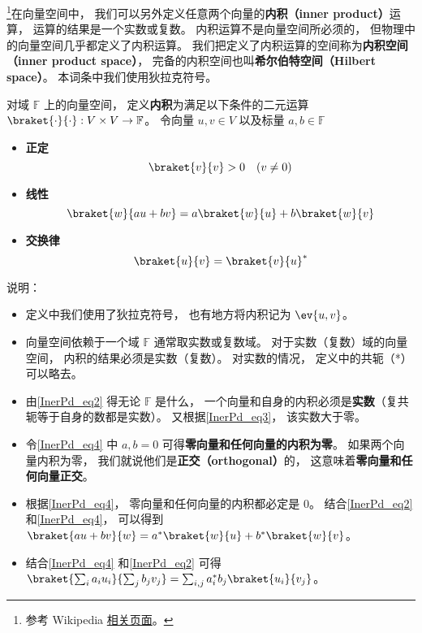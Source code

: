 

\footnote{参考 Wikipedia \href{https://en.wikipedia.org/wiki/Inner_product_space}{相关页面}。}在向量空间中， 我们可以另外定义任意两个向量的\textbf{内积（inner product）}运算， 运算的结果是一个实数或复数。 内积运算不是向量空间所必须的， 但物理中的向量空间几乎都定义了内积运算。 我们把定义了内积运算的空间称为\textbf{内积空间（inner product space）}， 完备的内积空间也叫\textbf{希尔伯特空间（Hilbert space）}。 本词条中我们使用狄拉克符号。

\begin{definition}{}
对域 $\mathbb F$ 上的向量空间， 定义\textbf{内积}为满足以下条件的二元运算 $\braket{\cdot}{\cdot}: V\times V\to \mathbb F$。 令向量 $u, v\in V$ 以及标量 $a, b \in \mathbb F$
\begin{itemize}
\item \textbf{正定}
\begin{equation}\label{InerPd_eq3}
\braket{v}{v} > 0 \quad (v \ne 0)
\end{equation}
\item \textbf{线性}
\begin{equation}\label{InerPd_eq4}
\braket{w}{a u + b v} = a\braket{w}{u} + b\braket{w}{v}
\end{equation}
\item \textbf{交换律}
\begin{equation}\label{InerPd_eq2}
\braket{u}{v} = \braket{v}{u}^*
\end{equation}
\end{itemize}
\end{definition}
说明：
\begin{itemize}
\item 定义中我们使用了狄拉克符号， 也有地方将内积记为 $\ev{u, v}$。
\item 向量空间依赖于一个域 $\mathbb F$ 通常取实数或复数域。 对于实数（复数）域的向量空间， 内积的结果必须是实数（复数）。 对实数的情况， 定义中的共轭（*）可以略去。
\item 由\autoref{InerPd_eq2}  得无论 $\mathbb F$ 是什么， 一个向量和自身的内积必须是\textbf{实数}（复共轭等于自身的数都是实数）。 又根据\autoref{InerPd_eq3}， 该实数大于零。
\item 令\autoref{InerPd_eq4} 中 $a,b= 0$ 可得\textbf{零向量和任何向量的内积为零}。 如果两个向量内积为零， 我们就说他们是\textbf{正交（orthogonal）}的， 这意味着\textbf{零向量和任何向量正交}。
\item 根据\autoref{InerPd_eq4}， 零向量和任何向量的内积都必定是 0。 结合\autoref{InerPd_eq2} 和\autoref{InerPd_eq4}， 可以得到 $\braket{a u + b v}{w} = a^*\braket{w}{u} + b^*\braket{w}{v}$。
\item 结合\autoref{InerPd_eq4} 和\autoref{InerPd_eq2} 可得 $\braket{\sum_i a_i u_i}{\sum_j b_j v_j} = \sum_{i,j} a_i^* b_j \braket{u_i}{v_j}$。
\end{itemize}

